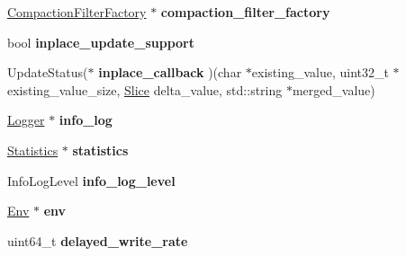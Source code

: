 \begin{DoxyCompactItemize}
\item 
\hyperlink{classrocksdb_1_1CompactionFilterFactory}{Compaction\+Filter\+Factory} $\ast$ {\bfseries compaction\+\_\+filter\+\_\+factory}\hypertarget{structrocksdb_1_1ImmutableCFOptions_a77c467684e4ab40bee083bf31e9e57e8}{}\label{structrocksdb_1_1ImmutableCFOptions_a77c467684e4ab40bee083bf31e9e57e8}

\item 
bool {\bfseries inplace\+\_\+update\+\_\+support}\hypertarget{structrocksdb_1_1ImmutableCFOptions_afbea74b4fbc4f040100b065824248b1d}{}\label{structrocksdb_1_1ImmutableCFOptions_afbea74b4fbc4f040100b065824248b1d}

\item 
Update\+Status($\ast$ {\bfseries inplace\+\_\+callback} )(char $\ast$existing\+\_\+value, uint32\+\_\+t $\ast$existing\+\_\+value\+\_\+size, \hyperlink{classrocksdb_1_1Slice}{Slice} delta\+\_\+value, std\+::string $\ast$merged\+\_\+value)\hypertarget{structrocksdb_1_1ImmutableCFOptions_ac7ed99f10af85c19c563625307f52e43}{}\label{structrocksdb_1_1ImmutableCFOptions_ac7ed99f10af85c19c563625307f52e43}

\item 
\hyperlink{classrocksdb_1_1Logger}{Logger} $\ast$ {\bfseries info\+\_\+log}\hypertarget{structrocksdb_1_1ImmutableCFOptions_ab361364acfcbc0b8ab5f115240d9f529}{}\label{structrocksdb_1_1ImmutableCFOptions_ab361364acfcbc0b8ab5f115240d9f529}

\item 
\hyperlink{classrocksdb_1_1Statistics}{Statistics} $\ast$ {\bfseries statistics}\hypertarget{structrocksdb_1_1ImmutableCFOptions_a8dfb8e2671a91bfbf84785fc555eaad7}{}\label{structrocksdb_1_1ImmutableCFOptions_a8dfb8e2671a91bfbf84785fc555eaad7}

\item 
Info\+Log\+Level {\bfseries info\+\_\+log\+\_\+level}\hypertarget{structrocksdb_1_1ImmutableCFOptions_a368c8511866af3152bb449944c933c8e}{}\label{structrocksdb_1_1ImmutableCFOptions_a368c8511866af3152bb449944c933c8e}

\item 
\hyperlink{classrocksdb_1_1Env}{Env} $\ast$ {\bfseries env}\hypertarget{structrocksdb_1_1ImmutableCFOptions_ae3881b8375a25afa2e0ccd4a747ee101}{}\label{structrocksdb_1_1ImmutableCFOptions_ae3881b8375a25afa2e0ccd4a747ee101}

\item 
uint64\+\_\+t {\bfseries delayed\+\_\+write\+\_\+rate}\hypertarget{structrocksdb_1_1ImmutableCFOptions_a17aad287cb54d5a5d932f9b309ea0627}{}\label{structrocksdb_1_1ImmutableCFOptions_a17aad287cb54d5a5d932f9b309ea0627}


\end{DoxyCompactItemize}

